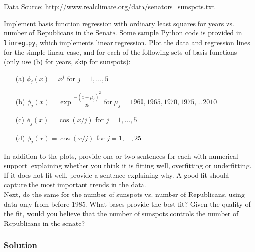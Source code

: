 \documentclass[submit]{harvardml}
\begin{document}
Data Source: \url{http://www.realclimate.org/data/senators_sunspots.txt}

\begin{problem}

Implement basis function regression with ordinary least squares for
years vs. number of Republicans in the Senate. Some sample Python code
is provided in \verb|linreg.py|, which implements linear regression.
Plot the data and regression lines for the simple linear case, and for
each of the following sets of basis functions (only use (b) for years, skip for sunspots):
\begin{itemize}
	\item[(a)] $\phi_j(x) = x^j$ for $j=1, \ldots, 5$
    \item[(b)] $\phi_j(x) = \exp{\frac{-(x-\mu_j)^2}{25}}$ for $\mu_j=1960, 1965, 1970, 1975, \ldots 2010$
	\item[(c)] $\phi_j(x) = \cos(x / j)$ for $j=1, \ldots, 5$
	\item[(d)] $\phi_j(x) = \cos(x / j)$ for $j=1, \ldots, 25$
\end{itemize}
In addition to the plots, provide one or two sentences for each with
numerical support, explaining whether you think it is fitting well,
overfitting or underfitting.  If it does not fit well, provide a
sentence explaining why. A good fit should capture the most important
trends in the data.\\

\noindent Next, do the same for the number of sunspots vs. number of
Republicans, using data only from before 1985.  What bases provide the
best fit?  Given the quality of the fit, would you believe that the
number of sunspots controls the number of Republicans in the senate?

\end{problem}



\subsubsection*{Solution}
\end{document}
